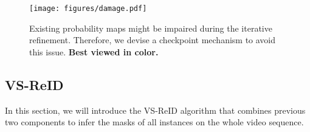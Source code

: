 \begin{figure}
	\centering
	\texttt{[image: figures/damage.pdf]}
	\caption{\small{Existing probability maps might be impaired during the iterative refinement. Therefore, we devise a checkpoint mechanism to avoid this issue. \textbf{Best viewed in color.}}}
	\label{fig:damage}
	\vspace{-12pt}
\end{figure}

\subsection{VS-ReID}
\label{sec:VS-ReID}
In this section, we will introduce the VS-ReID algorithm that combines previous two components to infer the masks of all instances on the whole video sequence.

